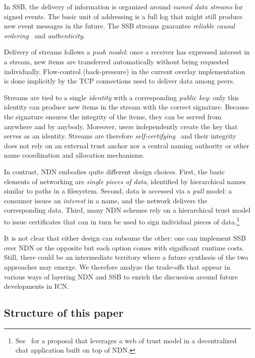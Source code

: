 \documentclass[9pt,sigconf]{acmart}
\begin{document}
In SSB, the delivery of information is organized around \textit{named
  data streams} for signed events. The basic unit of addressing is a
full log that might still produce new event messages in the future.
The SSB streams guarantee \textit{reliable causal
  ordering}~\cite{cachin2011introduction} and \textit{authenticity}.

Delivery of streams follows a \textit{push model}: once a receiver has
expressed interest in a stream, new items are transferred
automatically without being requested individually. Flow-control
(back-pressure) in the current overlay implementation is done
implicitly by the TCP connections used to deliver data among peers.

Streams are tied to a single \textit{identity} with a corresponding
\textit{public key}\/: only this identity can produce new items in the
stream with the correct signature.  Because the signature ensures the
integrity of the items, they can be served from anywhere and by
anybody.
%
Moreover, users independently create the key that serves as an
identity. Streams are therefore
\textit{self-certifying}~\cite{mazieres1998selfcertifyingpathnames}
and their integrity does not rely on an external trust anchor nor a
central naming authority or other name coordination and allocation
mechanisms.

In contrast, NDN embodies quite different design choices. First, the
basic elements of networking are \textit{single pieces of data},
identified by hierarchical names similar to paths in a
filesystem. Second, data is accessed via a \textit{pull} model: a
consumer issues an \textit{interest} in a name, and the network
delivers the corresponding data. Third, many NDN schemes rely on a
hierarchical trust model to issue certificates that can in turn be
used to sign individual pieces of
data.\footnote{See~\cite{zhu2012chronos} for a proposal that leverages
  a web of trust model in a decentralized chat application built on
  top of NDN.}

It is not clear that either design can subsume the other: one can
implement SSB over NDN or the opposite but each option comes with
significant runtime costs. Still, there could be an intermediate
territory where a future synthesis of the two approaches may
emerge. We therefore analyze the trade-offs that appear in various
ways of layering NDN and SSB to enrich the discussion around future
developments in ICN.

\subsection*{Structure of this paper}
\end{document}
